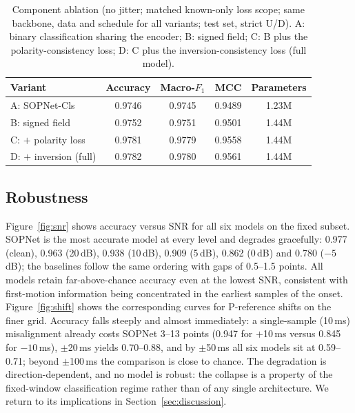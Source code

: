 \documentclass[11pt]{article}
\begin{document}
\begin{table}[t]
  \centering
  \caption{Component ablation (no jitter; matched known-only loss scope; same
  backbone, data and schedule for all variants; test set, strict U/D).
  A: binary classification sharing the encoder; B: signed field; C: B plus
  the polarity-consistency loss; D: C plus the inversion-consistency loss
  (full model).}
  \label{tab:ablation}
  \small
  \begin{tabular}{lcccc}
    \toprule
    Variant & Accuracy & Macro-$F_1$ & MCC & Parameters \\
    \midrule
    A: SOPNet-Cls            & 0.9746 & 0.9745 & 0.9489 & 1.23M \\
    B: signed field          & 0.9752 & 0.9751 & 0.9501 & 1.44M \\
    C: $+$ polarity loss     & 0.9781 & 0.9779 & 0.9558 & 1.44M \\
    D: $+$ inversion (full)  & 0.9782 & 0.9780 & 0.9561 & 1.44M \\
    \bottomrule
  \end{tabular}
\end{table}

\subsection{Robustness}
\label{sec:robustness}

Figure~\ref{fig:snr} shows accuracy versus SNR for all six models on the fixed
subset. SOPNet is the most accurate model at every level and degrades
gracefully: 0.977 (clean), 0.963 (20\,dB), 0.938 (10\,dB), 0.909 (5\,dB),
0.862 (0\,dB) and 0.780 ($-5$\,dB); the baselines follow the same ordering
with gaps of 0.5--1.5 points. All models retain far-above-chance accuracy
even at the lowest SNR, consistent with first-motion information being
concentrated in the earliest samples of the onset.
Figure~\ref{fig:shift} shows the corresponding curves for P-reference shifts
on the finer grid. Accuracy falls steeply and almost immediately: a
single-sample (10\,ms) misalignment already costs SOPNet 3--13 points
(0.947 for $+$10\,ms versus 0.845 for $-10$\,ms), $\pm$20\,ms yields
0.70--0.88, and by $\pm$50\,ms all six models sit at 0.59--0.71; beyond
$\pm$100\,ms the comparison is close to chance. The degradation is
direction-dependent, and no model is robust: the collapse is a property of
the fixed-window classification regime rather than of any single
architecture. We return to its implications in Section~\ref{sec:discussion}.
\end{document}

